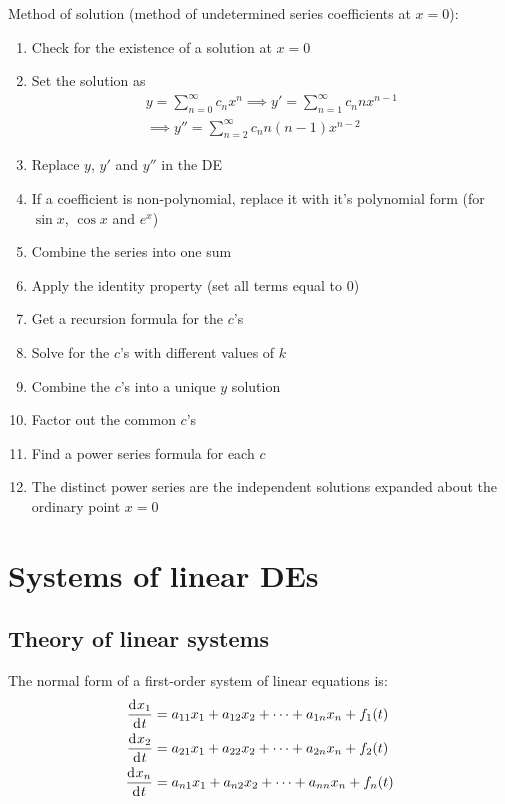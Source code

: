 \documentclass[10pt, twocolumn]{article}
\theoremstyle{definition}
\begin{document}
Method of solution (method of undetermined series coefficients at \(x = 0\)):
\begin{enumerate}
  \item Check for the existence of a solution at \(x = 0\)
  \item Set the solution as
        \begin{gather*}
          y = \sum_ {n = 0}^{\infty}{c_n x^n } \implies y' = \sum_ {n = 1}^{\infty}{c_n nx^{n-1}}\\
          \implies y'' = \sum_ {n = 2}^{\infty}{c_n n(n - 1)x^{n-2}}
        \end{gather*}
  \item Replace \(y\), \(y'\) and \(y''\) in the DE
  \item If a coefficient is non-polynomial, replace it with it's polynomial form (for \(\sin{x}\), \(\cos{x}\) and \(e^x \))
  \item Combine the series into one sum
  \item Apply the identity property (set all terms equal to 0)
  \item Get a recursion formula for the \(c\)'s
  \item Solve for the \(c\)'s with different values of \(k\)
  \item Combine the \(c\)'s into a unique \(y\) solution
  \item Factor out the common \(c\)'s
  \item Find a power series formula for each \(c\)
  \item The distinct power series are the independent solutions expanded about the ordinary point \(x = 0\)
\end{enumerate}


\section{Systems of linear DEs}
\subsection{Theory of linear systems}
The normal form of a first-order system of linear equations is:
\begin{align*}
  \frac{\mathrm{d}^{} x_1}{\mathrm{d}^{} t} & = a_{11}x_1 + a_{12}x_2 + \cdots + a_{1n}x_n + f_1 (t) \\
  \frac{\mathrm{d}^{} x_2}{\mathrm{d}^{} t} & = a_{21}x_1 + a_{22}x_2 + \cdots + a_{2n}x_n + f_2 (t) \\
  \frac{\mathrm{d}^{} x_n}{\mathrm{d}^{} t} & = a_{n1}x_1 + a_{n2}x_2 + \cdots + a_{nn}x_n + f_n (t)
\end{align*}
\end{document}
